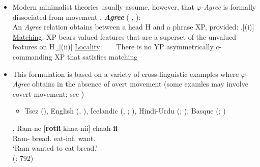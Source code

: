 \documentclass[11pt, letterpaper]{paper_nick}
\begin{document}
\begin{itemize}
\item Modern minimalist theories usually assume, however, that $\varphi$-\emph{Agree} is formally dissociated from movement
\ex. {\bf \emph{Agree}} (\citeauthor{chomsky00} \citeyear{chomsky00}, \citeyear{chomsky01}):\\
An \emph{Agree} relation obtains between a head H and a phrase XP, provided:
\a.[(i)] \ul{Matching}: XP bears valued features that are a superset of the unvalued features on H 
\b.[(ii)] \ul{Locality}:\ \ \ \ There is no YP asymmetrically c-commanding XP that satisfies matching

\item This formulation is based on a variety of cross-linguistic examples where $\varphi$-\emph{Agree} obtains in the absence of overt movement (some examles may involve covert movement; see \citealt{koopman06})
\begin{itemize}
\item Tsez (\citealt{polinsky01}), English (\citealt{chomsky00}, \citeyear{chomsky01}), Icelandic (\citealt{sigurdhsson96}, \citeyear{sigurdhsson08}; \citealt{boeckx08b}), Hindi-Urdu (\citealt{boeckx04}; \citealt{bhatt05}), Basque (\citealt{etxepare07}; \citealt{preminger09})
\end{itemize}
\exg. Ram-ne [{\bf rotii} khaa-nii] chaah-{\bf ii}\\
Ram- bread. eat-inf. want.\\
`Ram wanted to eat bread.'\\
(\citealt{bhatt05}: 792)


\end{itemize}
\end{document}
